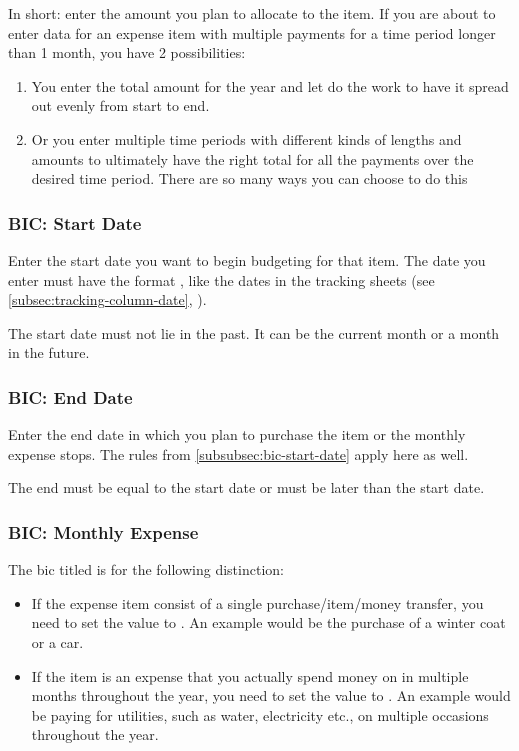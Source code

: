 In short: enter the amount you plan to allocate to the item.
If you are about to enter data for an expense item with multiple payments for a time period longer than 1 month, you have 2 possibilities:
\begin{enumerate}
	\item You enter the total amount for the year and let \tfn do the work to have it spread out evenly from start to end.
	\item Or you enter multiple time periods with different kinds of lengths and amounts to ultimately have the right total for all the payments over the desired time period.
	There are so many ways you can choose to do this
\end{enumerate}

\subsubsection{BIC: Start Date}
\label{subsubsec:bic-start-date}

Enter the start date you want to begin budgeting for that item.
The date you enter must have the format , like the dates in the tracking sheets (see \autoref{subsec:tracking-column-date}, ).

\begin{specialnote}
	The start date must not lie in the past.
	It can be the current month or a month in the future.
\end{specialnote}

\subsubsection{BIC: End Date}
\label{subsubsec:bic-end-date}

Enter the end date in which you plan to purchase the item or the monthly expense stops.
The rules from \autoref{subsubsec:bic-start-date} apply here as well.

\begin{specialnote}
	The end must be equal to the start date or must be later than the start date.
\end{specialnote}

\subsubsection{BIC: Monthly Expense}
\label{subsubsec:bic-monthly-expense}

The \ac{bic} titled  is for the following distinction:
\begin{itemize}
	\item If the expense item consist of a single purchase/item/money transfer, you need to set the value to .
	An example would be the purchase of a winter coat or a car.
	\item If the item is an expense that you actually spend money on in multiple months throughout the year, you need to set the value to .
	An example would be paying for \eg utilities, such as water, electricity etc., on multiple occasions throughout the year.
\end{itemize}

